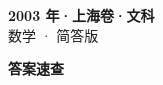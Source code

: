 \documentclass[zihao=-4, a4paper]{ctexart}
\begin{document}
\begin{center}
  {\Large\bfseries 2003 年·上海卷·文科}\\[4pt]
  {\large 数学 · 简答版}
\end{center}
\medskip
{}

\clearpage
{}
\begin{center}{\Large\bfseries 答案速查}\end{center}
\medskip

\end{document}

